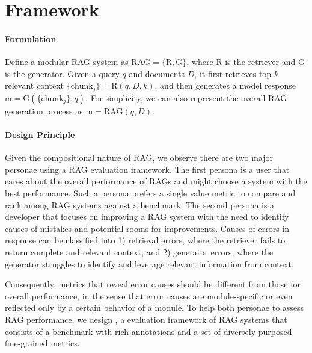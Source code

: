 \section{\benchname\space Framework}

\paragraph{Formulation} Define a modular RAG system as $\text{RAG} = \{\text{R}, \text{G}\}$, where $\text{R}$ is the retriever and $\text{G}$ is the generator. Given a query $q$ and documents $D$, it first retrieves top-$k$ relevant context $\{\text{chunk}_j\}=\text{R}(q, D, k)$, and then generates a model response $\text{m} = \text{G}(\{\text{chunk}_j\}, q)$. For simplicity, we can also represent the overall RAG generation process as $\text{m} = \text{RAG}(q, D)$. 

\paragraph{Design Principle} Given the compositional nature of RAG, we observe there are two major personae using a RAG evaluation framework. The first persona is a user that cares about the overall performance of RAGs and might choose a system with the best performance. Such a persona prefers a single value metric to compare and rank among RAG systems against a benchmark. The second persona is a developer that focuses on improving a RAG system with the need to identify causes of mistakes and potential rooms for improvements. Causes of errors in response can be classified into 1) retrieval errors, where the retriever fails to return complete and relevant context, and 2) generator errors, where the generator struggles to identify and leverage relevant information from context.


Consequently, metrics that reveal error causes should be different from those for overall performance, in the sense that error causes are module-specific or even reflected only by a certain behavior of a module. To help both personae to assess RAG performance, we design \benchname\space, a evaluation framework of RAG systems that consists of a benchmark with rich annotations and a set of diversely-purposed fine-grained metrics.

